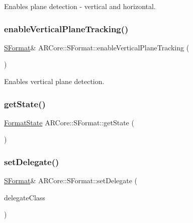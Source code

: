 Enables plane detection -\/ vertical and horizontal. 

\mbox{\label{class_a_r_core_1_1_s_format_a50041dc949c7e00b5febb8c8f102f386}} 
\subsubsection{\texorpdfstring{enable\+Vertical\+Plane\+Tracking()}{enableVerticalPlaneTracking()}}
{\footnotesize\ttfamily \mbox{\hyperlink{class_a_r_core_1_1_s_format}{S\+Format}}\& A\+R\+Core\+::\+S\+Format\+::enable\+Vertical\+Plane\+Tracking (\begin{DoxyParamCaption}{ }\end{DoxyParamCaption})\hspace{0.3cm}{\ttfamily [inline]}}



Enables vertical plane detection. 

\mbox{\label{class_a_r_core_1_1_s_format_a99e7aa08fc727c1f45a6a2277b5764fb}} 
\subsubsection{\texorpdfstring{get\+State()}{getState()}}
{\footnotesize\ttfamily \mbox{\hyperlink{struct_a_r_core_1_1_format_state}{Format\+State}} A\+R\+Core\+::\+S\+Format\+::get\+State (\begin{DoxyParamCaption}{ }\end{DoxyParamCaption})\hspace{0.3cm}{\ttfamily [inline]}}

\mbox{\label{class_a_r_core_1_1_s_format_a944fac3b51c5193dcb306bd482f4f1f1}} 
\subsubsection{\texorpdfstring{set\+Delegate()}{setDelegate()}}
{\footnotesize\ttfamily \mbox{\hyperlink{class_a_r_core_1_1_s_format}{S\+Format}}\& A\+R\+Core\+::\+S\+Format\+::set\+Delegate (\begin{DoxyParamCaption}\item[{N\+S\+Object$<$ A\+R\+Session\+Delegate $>$ $\ast$}]{delegate\+Class }\end{DoxyParamCaption})\hspace{0.3cm}{\ttfamily [inline]}}



